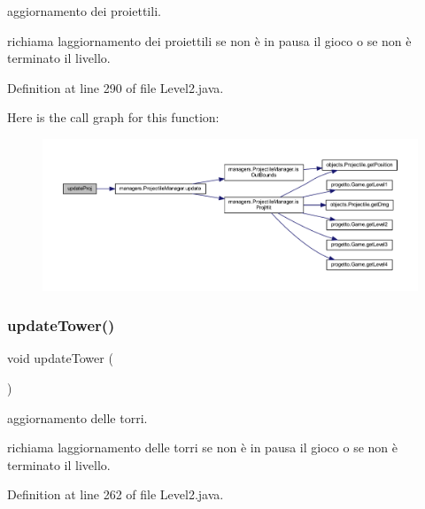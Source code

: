aggiornamento dei proiettili. 

richiama l\textquotesingle{}aggiornamento dei proiettili se non è in pausa il gioco o se non è terminato il livello. 

Definition at line 290 of file Level2.\+java.

Here is the call graph for this function\+:\nopagebreak
\begin{figure}[H]
\begin{center}
\leavevmode
\includegraphics[width=350pt]{classscenes_1_1_level2_ac83c203b559f6fd0bb225744d7ccf854_cgraph}
\end{center}
\end{figure}
\mbox{\label{classscenes_1_1_level2_ae4fd4a959e4d782a5e7ac0eff77ba27f}} 
\subsubsection{\texorpdfstring{update\+Tower()}{updateTower()}}
{\footnotesize\ttfamily void update\+Tower (\begin{DoxyParamCaption}{ }\end{DoxyParamCaption})}



aggiornamento delle torri. 

richiama l\textquotesingle{}aggiornamento delle torri se non è in pausa il gioco o se non è terminato il livello. 

Definition at line 262 of file Level2.\+java.

